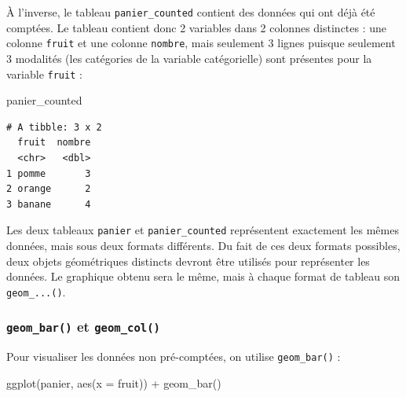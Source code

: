 \documentclass[
  letterpaper,
  DIV=11,
  numbers=noendperiod]{scrreprt}
\newenvironment{Shaded}{\begin{snugshade}}{\end{snugshade}}
\newcommand{\AttributeTok}[1]{\textcolor[rgb]{0.40,0.45,0.13}{#1}}
\newcommand{\FunctionTok}[1]{\textcolor[rgb]{0.28,0.35,0.67}{#1}}
\newcommand{\NormalTok}[1]{\textcolor[rgb]{0.00,0.23,0.31}{#1}}
\newcommand{\SpecialCharTok}[1]{\textcolor[rgb]{0.37,0.37,0.37}{#1}}
\begin{document}
À l'inverse, le tableau \texttt{panier\_counted} contient des données
qui ont déjà été comptées. Le tableau contient donc 2 variables dans 2
colonnes distinctes : une colonne \texttt{fruit} et une colonne
\texttt{nombre}, mais seulement 3 lignes puisque seulement 3 modalités
(les catégories de la variable catégorielle) sont présentes pour la
variable \texttt{fruit} :

\begin{Shaded}
\begin{Highlighting}[]
\NormalTok{panier\_counted}
\end{Highlighting}
\end{Shaded}

\begin{verbatim}
# A tibble: 3 x 2
  fruit  nombre
  <chr>   <dbl>
1 pomme       3
2 orange      2
3 banane      4
\end{verbatim}

Les deux tableaux \texttt{panier} et \texttt{panier\_counted}
représentent exactement les mêmes données, mais sous deux formats
différents. Du fait de ces deux formats possibles, deux objets
géométriques distincts devront être utilisés pour représenter les
données. Le graphique obtenu sera le même, mais à chaque format de
tableau son \texttt{geom\_...()}.

\hypertarget{geom_bar-et-geom_col}{%
\subsubsection{\texorpdfstring{\texttt{geom\_bar()} et
\texttt{geom\_col()}}{geom\_bar() et geom\_col()}}\label{geom_bar-et-geom_col}}

Pour visualiser les données non pré-comptées, on utilise
\texttt{geom\_bar()} :

\begin{Shaded}
\begin{Highlighting}[]
\FunctionTok{ggplot}\NormalTok{(panier, }\FunctionTok{aes}\NormalTok{(}\AttributeTok{x =}\NormalTok{ fruit)) }\SpecialCharTok{+}
  \FunctionTok{geom\_bar}\NormalTok{()}
\end{Highlighting}
\end{Shaded}
\end{document}
